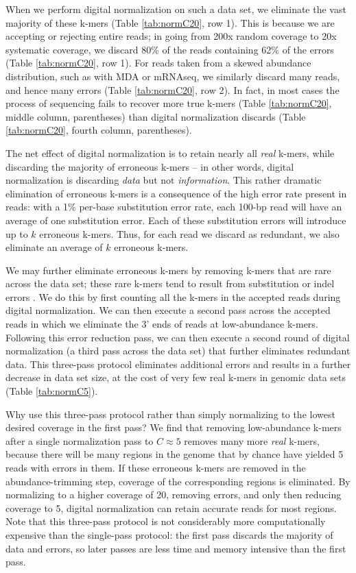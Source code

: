 \documentclass{pnastwo}
\begin{document}
\begin{article}
When we perform digital normalization on such a data set, we eliminate
the vast majority of these k-mers (Table \ref{tab:normC20}, row 1).
This is because we are accepting or rejecting entire reads; in
going from 200x random coverage to 20x systematic coverage, we
discard 80\% of the reads containing 62\% of the errors (Table
\ref{tab:normC20}, row 1).  For reads taken from a skewed abundance
distribution, such as with MDA or mRNAseq, we similarly discard many
reads, and hence many errors (Table \ref{tab:normC20}, row 2).  In
fact, in most cases the process of sequencing fails to recover
more true k-mers (Table \ref{tab:normC20}, middle column, parentheses) than
digital
normalization discards (Table \ref{tab:normC20}, fourth column, parentheses).

The net effect of digital normalization is to retain nearly all {\em
  real} k-mers, while discarding the majority of erroneous k-mers --
in other words, digital normalization is discarding {\em data} but not
{\em information}.  This rather dramatic elimination of erroneous
k-mers is a consequence of the high error rate present in reads: with
a 1\% per-base substitution error rate, each 100-bp read will have an
average of one substitution error. Each of these substitution errors
will introduce up to $k$ erroneous k-mers.  Thus, for each read we
discard as redundant, we also eliminate an average of $k$ erroneous
k-mers.

We may further eliminate erroneous k-mers by removing k-mers that are
rare across the data set; these rare k-mers tend to result from
substitution or indel errors \cite{pubmed21114842}.  We do this by
first counting all the k-mers in the accepted reads during digital
normalization.  We can then execute a second pass across the accepted
reads in which we eliminate the 3' ends of reads at low-abundance
k-mers.  Following this error reduction pass, we can then execute a
second round of digital normalization (a third pass across the data
set) that further eliminates redundant data.  This three-pass protocol
eliminates additional errors and results in a further decrease in data
set size, at the cost of very few real k-mers in genomic data sets
(Table \ref{tab:normC5}).

Why use this three-pass protocol rather than simply normalizing to the
lowest desired coverage in the first pass?  We find that removing
low-abundance k-mers after a single normalization pass to $C \approx
5$ removes many more {\em real} k-mers, because there will be many
regions in the genome that by chance have yielded 5 reads with errors
in them. If these erroneous k-mers are removed in the abundance-trimming step,
coverage of the corresponding regions is eliminated.  By normalizing
to a higher coverage of 20, removing errors, and only then reducing
coverage to 5, digital normalization can retain accurate reads for most
regions.  Note that this three-pass protocol is not considerably more
computationally expensive than the single-pass protocol: the first
pass discards the majority of data and errors, so later passes are
less time and memory intensive than the first pass.


\end{article}
\end{document}
